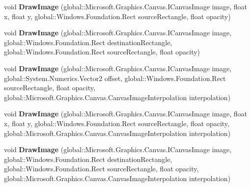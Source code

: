 \begin{DoxyCompactItemize}
void {\bfseries Draw\+Image} (global\+::\+Microsoft.\+Graphics.\+Canvas.\+I\+Canvas\+Image image, float x, float y, global\+::\+Windows.\+Foundation.\+Rect source\+Rectangle, float opacity)
\item 
\mbox{\label{class_microsoft_1_1_graphics_1_1_canvas_1_1_canvas_drawing_session_a905b60a8b82adc114f6d8420b5096b3a}} 
void {\bfseries Draw\+Image} (global\+::\+Microsoft.\+Graphics.\+Canvas.\+I\+Canvas\+Image image, global\+::\+Windows.\+Foundation.\+Rect destination\+Rectangle, global\+::\+Windows.\+Foundation.\+Rect source\+Rectangle, float opacity)
\item 
\mbox{\label{class_microsoft_1_1_graphics_1_1_canvas_1_1_canvas_drawing_session_a2c9e8c707cb2a9342b462532ffc458ac}} 
void {\bfseries Draw\+Image} (global\+::\+Microsoft.\+Graphics.\+Canvas.\+I\+Canvas\+Image image, global\+::\+System.\+Numerics.\+Vector2 offset, global\+::\+Windows.\+Foundation.\+Rect source\+Rectangle, float opacity, global\+::\+Microsoft.\+Graphics.\+Canvas.\+Canvas\+Image\+Interpolation interpolation)
\item 
\mbox{\label{class_microsoft_1_1_graphics_1_1_canvas_1_1_canvas_drawing_session_aa49faf088b25fac5a055148d09d1eff1}} 
void {\bfseries Draw\+Image} (global\+::\+Microsoft.\+Graphics.\+Canvas.\+I\+Canvas\+Image image, float x, float y, global\+::\+Windows.\+Foundation.\+Rect source\+Rectangle, float opacity, global\+::\+Microsoft.\+Graphics.\+Canvas.\+Canvas\+Image\+Interpolation interpolation)
\item 
\mbox{\label{class_microsoft_1_1_graphics_1_1_canvas_1_1_canvas_drawing_session_a3c2a089b12fc1e33bb3b5ae2635ae0fa}} 
void {\bfseries Draw\+Image} (global\+::\+Microsoft.\+Graphics.\+Canvas.\+I\+Canvas\+Image image, global\+::\+Windows.\+Foundation.\+Rect destination\+Rectangle, global\+::\+Windows.\+Foundation.\+Rect source\+Rectangle, float opacity, global\+::\+Microsoft.\+Graphics.\+Canvas.\+Canvas\+Image\+Interpolation interpolation)
\item 
\mbox{\label{class_microsoft_1_1_graphics_1_1_canvas_1_1_canvas_drawing_session_af0f0b4966926f42572dd6ea8a83e5632}} 

\end{DoxyCompactItemize}
